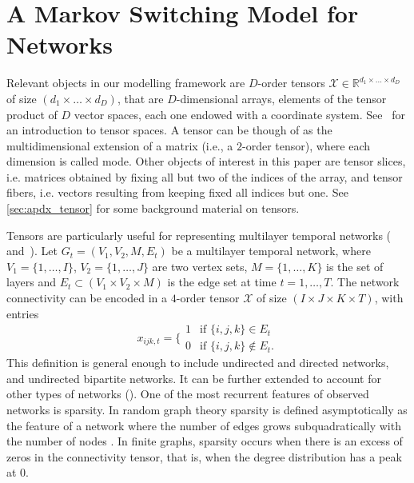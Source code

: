 \documentclass[12pt,a4paper]{article}
\def \R{\mathds{R}}
\theoremstyle{custom}
\begin{document}
\section{A Markov Switching Model for Networks} \label{sec:model}
Relevant objects in our modelling framework are $D$-order tensors $\mathcal{X} \in \R^{d_1\times\ldots\times d_D}$ of size $(d_1\times\ldots\times d_D)$, that are $D$-dimensional arrays, elements of the tensor product of $D$ vector spaces, each one endowed with a coordinate system. See~\cite{Hackbusch12Tensor_book} for an introduction to tensor spaces. A tensor can be though of as the multidimensional extension of a matrix (i.e., a $2$-order tensor), where each dimension is called mode. Other objects of interest in this paper are tensor slices, i.e. matrices obtained by fixing all but two of the indices of the array, and tensor fibers, i.e. vectors resulting from keeping fixed all indices but one. See \autoref{sec:apdx_tensor} for some background material on tensors.

Tensors are particularly useful for representing multilayer temporal networks (\cite{Boccaletti14Multilayer_Networks} and~\cite{Kivela14Multilayer_Networks}). Let $G_t = (V_1,V_2,M,E_t)$ be a multilayer temporal network, where $V_1 = \lbrace 1,\ldots,I \rbrace$, $V_2 = \lbrace 1,\ldots,J \rbrace$ are two vertex sets, $M = \lbrace 1,\ldots,K \rbrace$ is the set of layers and $E_t \subset (V_1 \times V_2 \times M)$ is the edge set at time $t=1,\ldots,T$. The network connectivity can be encoded in a $4$-order tensor $\mathcal{X}$ of size $(I\times J\times K\times T)$, with entries
\begin{equation}
x_{ijk,t} = \Bigg\{ \begin{array}{cc}
1 & \text{if } \lbrace i,j,k \rbrace \in E_t \\
0 & \text{if } \lbrace i,j,k \rbrace \notin E_t.
\end{array}
\end{equation}
This definition is general enough to include undirected and directed networks, and undirected bipartite networks. It can be further extended to account for other types of networks (\cite{Kivela14Multilayer_Networks}).
One of the most recurrent features of observed networks is sparsity. In random graph theory sparsity is defined asymptotically as the feature of a network where the number of edges grows subquadratically with the number of nodes \cite[see][ch.7]{Diestel12GraphTheory}.
In finite graphs, sparsity occurs when there is an excess of zeros in the connectivity tensor, that is, when the degree distribution has a peak at $0$.
\end{document}
